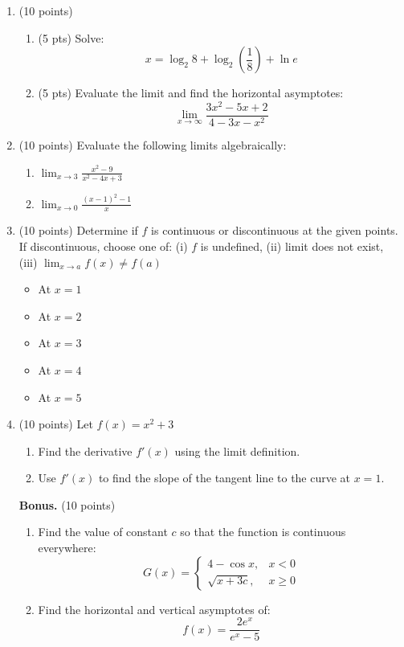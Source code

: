 \documentclass[12pt]{article}
\begin{document}
\begin{enumerate}
    \item (10 points)
    \begin{enumerate}
        \item (5 pts) Solve:
        \[
        x = \log_2 8 + \log_2 \left(\frac{1}{8}\right) + \ln e
        \]

        \item (5 pts) Evaluate the limit and find the horizontal asymptotes:
        \[
        \lim_{x \to \infty} \frac{3x^2 - 5x + 2}{4 - 3x - x^2}
        \]
    \end{enumerate}

    \item (10 points) Evaluate the following limits algebraically:
    \begin{enumerate}
        \item \( \lim_{x \to 3} \frac{x^2 - 9}{x^2 - 4x + 3} \)
        \item \( \lim_{x \to 0} \frac{(x - 1)^2 - 1}{x} \)
    \end{enumerate}

    \item (10 points) Determine if \( f \) is continuous or discontinuous at the given points. If discontinuous, choose one of: 
    (i) \( f \) is undefined, 
    (ii) limit does not exist, 
    (iii) \( \lim_{x \to a} f(x) \neq f(a) \)
    \begin{itemize}
        \item At \( x = 1 \)
        \item At \( x = 2 \)
        \item At \( x = 3 \)
        \item At \( x = 4 \)
        \item At \( x = 5 \)
    \end{itemize}

    \item (10 points) Let \( f(x) = x^2 + 3 \)
    \begin{enumerate}
        \item Find the derivative \( f'(x) \) using the limit definition.
        \item Use \( f'(x) \) to find the slope of the tangent line to the curve at \( x = 1 \).
    \end{enumerate}

    \item[\textbf{Bonus.}] (10 points)
    \begin{enumerate}
        \item Find the value of constant \( c \) so that the function is continuous everywhere:
        \[
        G(x) = 
        \begin{cases}
            4 - \cos x, & x < 0 \\
            \sqrt{x + 3c}, & x \geq 0
        \end{cases}
        \]

        \item Find the horizontal and vertical asymptotes of:
        \[
        f(x) = \frac{2e^x}{e^x - 5}
        \]
    \end{enumerate}
\end{enumerate}
\end{document}
